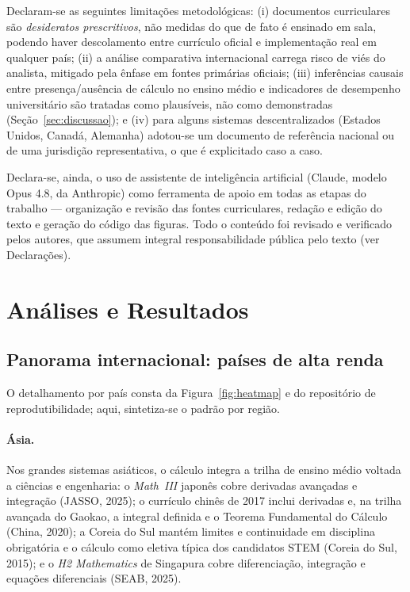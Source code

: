 \documentclass[12pt,a4paper,oneside]{article}
\begin{document}
Declaram-se as seguintes limitações metodológicas: (i) documentos
curriculares são \emph{desideratos prescritivos}, não medidas do que de
fato é ensinado em sala, podendo haver descolamento entre currículo
oficial e implementação real em qualquer país; (ii) a análise comparativa
internacional carrega risco de viés do analista, mitigado pela ênfase em
fontes primárias oficiais; (iii) inferências causais entre
presença/ausência de cálculo no ensino médio e indicadores de desempenho
universitário são tratadas como plausíveis, não como demonstradas
(Seção~\ref{sec:discussao}); e (iv) para alguns sistemas
descentralizados (Estados Unidos, Canadá, Alemanha) adotou-se um
documento de referência nacional ou de uma jurisdição representativa, o
que é explicitado caso a caso.

Declara-se, ainda, o uso de assistente de inteligência artificial
(Claude, modelo Opus 4.8, da Anthropic) como ferramenta de apoio em
todas as etapas do trabalho --- organização e revisão das fontes
curriculares, redação e edição do texto e geração do código das figuras.
Todo o conteúdo foi revisado e verificado pelos autores, que assumem
integral responsabilidade pública pelo texto (ver Declarações).

\section{Análises e Resultados}

\subsection{Panorama internacional: países de alta renda}

O detalhamento por país consta da Figura~\ref{fig:heatmap} e do
repositório de reprodutibilidade; aqui, sintetiza-se o padrão por região.

\paragraph{Ásia.} Nos grandes sistemas asiáticos, o cálculo integra a
trilha de ensino médio voltada a ciências e engenharia: o \emph{Math~III}
japonês cobre derivadas avançadas e integração (JASSO, 2025); o currículo
chinês de 2017 inclui derivadas e, na trilha avançada do Gaokao, a
integral definida e o Teorema Fundamental do Cálculo (China, 2020); a
Coreia do Sul mantém limites e continuidade em disciplina obrigatória e o
cálculo como eletiva típica dos candidatos STEM (Coreia do Sul, 2015); e o
\emph{H2 Mathematics} de Singapura cobre diferenciação, integração e
equações diferenciais (SEAB, 2025).
\end{document}
